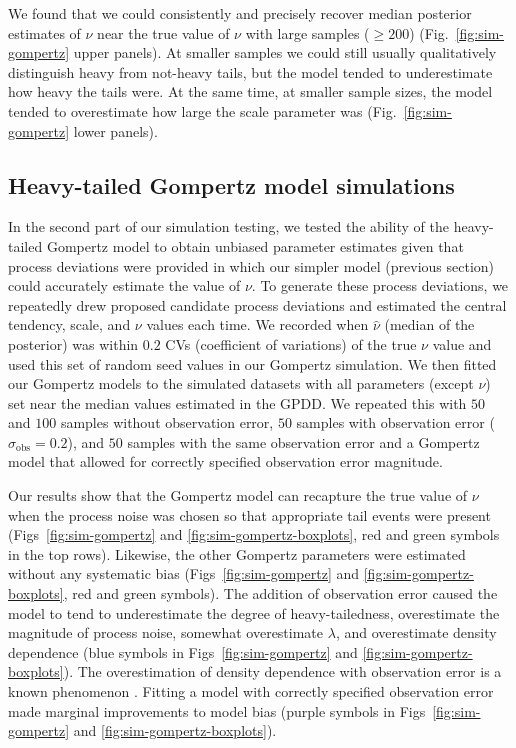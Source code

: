 We found that we could consistently and precisely recover median posterior
estimates of $\nu$ near the true value of $\nu$ with large samples ($\ge 200$)
(Fig.~\ref{fig:sim-gompertz} upper panels). At smaller samples we could still
usually qualitatively distinguish heavy from not-heavy tails, but the model
tended to underestimate how heavy the tails were. At the same time, at smaller
sample sizes, the model tended to overestimate how large the scale parameter
was (Fig.~\ref{fig:sim-gompertz} lower panels).

\subsection{Heavy-tailed Gompertz model simulations}

In the second part of our simulation testing, we tested the ability of the
heavy-tailed Gompertz model to obtain unbiased parameter estimates given that
process deviations were provided in which our simpler model (previous section)
could accurately estimate the value of $\nu$. To generate these process
deviations, we repeatedly drew proposed candidate process deviations and
estimated the central tendency, scale, and $\nu$ values each time. We recorded
when $\hat{\nu}$ (median of the posterior) was within $0.2$ CVs (coefficient of
variations) of the true $\nu$ value and used this set of random seed values in
our Gompertz simulation. We then fitted our Gompertz models to the simulated
datasets with all parameters (except $\nu$) set near the median values
estimated in the GPDD. We repeated this with $50$ and $100$ samples without
observation error, $50$ samples with observation error ($\sigma_\mathrm{obs}
= 0.2$), and $50$ samples with the same observation error and a Gompertz model
that allowed for correctly specified observation error magnitude.

Our results show that the Gompertz model can recapture the true value of $\nu$
when the process noise was chosen so that appropriate tail events were present
(Figs~\ref{fig:sim-gompertz} and \ref{fig:sim-gompertz-boxplots}, red and green
symbols in the top rows). Likewise, the other Gompertz parameters were
estimated without any systematic bias (Figs~\ref{fig:sim-gompertz} and
\ref{fig:sim-gompertz-boxplots}, red and green symbols). The addition of
observation error caused the model to tend to underestimate the degree of
heavy-tailedness, overestimate the magnitude of process noise, somewhat
overestimate $\lambda$, and overestimate density dependence (blue symbols in
Figs~\ref{fig:sim-gompertz} and \ref{fig:sim-gompertz-boxplots}). The
overestimation of density dependence with observation error is a known
phenomenon \citep{knape2012}. Fitting a model with correctly specified
observation error made marginal improvements to model bias (purple symbols in
Figs~\ref{fig:sim-gompertz} and \ref{fig:sim-gompertz-boxplots}).

